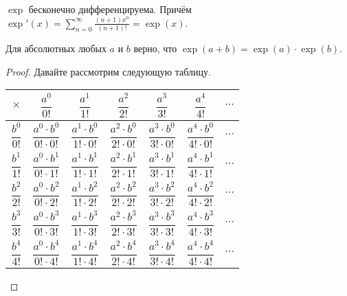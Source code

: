 \documentclass[12pt,a4paper]{article}
\begin{document}
    \begin{corollary}
        $\exp$ бесконечно дифференцируема. Причём $\exp'(x) = \sum_{n=0}^\infty \frac{(n+1)x^n}{(n+1)!} = \exp(x)$.
    \end{corollary}

    \begin{statement}
        Для абсолютных любых $a$ и $b$ верно, что $\exp(a+b) = \exp(a) \cdot \exp(b)$.
    \end{statement}

    \begin{proof}
        Давайте рассмотрим следующую таблицу.
        \begin{table}[h]
            \centering
            \begin{tabular}{c||c|c|c|c|c|c}
                \raisebox{-14pt}{\rule{0pt}{36pt}}$\times$ & $\dfrac{a^0}{0!}$ & $\dfrac{a^1}{1!}$ & $\dfrac{a^2}{2!}$ & $\dfrac{a^3}{3!}$ & $\dfrac{a^4}{4!}$ & $\cdots$\\
                \hline
                \hline
                \raisebox{-14pt}{\rule{0pt}{36pt}}$\dfrac{b^0}{0!}$ & $\dfrac{a^0 \cdot b^0}{0! \cdot 0!}$ & $\dfrac{a^1 \cdot b^0}{1! \cdot 0!}$ & $\dfrac{a^2 \cdot b^0}{2! \cdot 0!}$ & $\dfrac{a^3 \cdot b^0}{3! \cdot 0!}$ & $\dfrac{a^4 \cdot b^0}{4! \cdot 0!}$ & $\cdots$\\
                \hline
                \raisebox{-14pt}{\rule{0pt}{36pt}}$\dfrac{b^1}{1!}$ & $\dfrac{a^0 \cdot b^1}{0! \cdot 1!}$ & $\dfrac{a^1 \cdot b^1}{1! \cdot 1!}$ & $\dfrac{a^2 \cdot b^1}{2! \cdot 1!}$ & $\dfrac{a^3 \cdot b^1}{3! \cdot 1!}$ & $\dfrac{a^4 \cdot b^1}{4! \cdot 1!}$ & $\cdots$\\
                \hline
                \raisebox{-14pt}{\rule{0pt}{36pt}}$\dfrac{b^2}{2!}$ & $\dfrac{a^0 \cdot b^2}{0! \cdot 2!}$ & $\dfrac{a^1 \cdot b^2}{1! \cdot 2!}$ & $\dfrac{a^2 \cdot b^2}{2! \cdot 2!}$ & $\dfrac{a^3 \cdot b^2}{3! \cdot 2!}$ & $\dfrac{a^4 \cdot b^2}{4! \cdot 2!}$ & $\cdots$\\
                \hline
                \raisebox{-14pt}{\rule{0pt}{36pt}}$\dfrac{b^3}{3!}$ & $\dfrac{a^0 \cdot b^3}{0! \cdot 3!}$ & $\dfrac{a^1 \cdot b^3}{1! \cdot 3!}$ & $\dfrac{a^2 \cdot b^3}{2! \cdot 3!}$ & $\dfrac{a^3 \cdot b^3}{3! \cdot 3!}$ & $\dfrac{a^4 \cdot b^3}{4! \cdot 3!}$ & $\cdots$\\
                \hline
                \raisebox{-14pt}{\rule{0pt}{36pt}}$\dfrac{b^4}{4!}$ & $\dfrac{a^0 \cdot b^4}{0! \cdot 4!}$ & $\dfrac{a^1 \cdot b^4}{1! \cdot 4!}$ & $\dfrac{a^2 \cdot b^4}{2! \cdot 4!}$ & $\dfrac{a^3 \cdot b^4}{3! \cdot 4!}$ & $\dfrac{a^4 \cdot b^4}{4! \cdot 4!}$ & $\cdots$\\

\end{tabular}
\end{table}
\end{proof}
\end{document}
